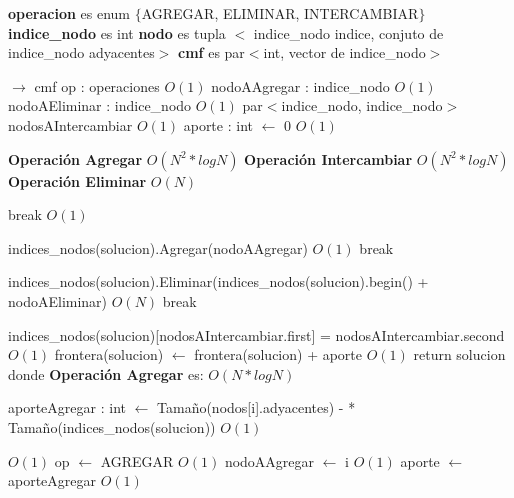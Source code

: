 \documentclass[a4paper, 10pt, twoside]{article}
\newenvironment{pseudo}[1][]{%
    \vspace{1em}%
    \begin{algorithmic}%
}
{%
    \end{algorithmic}%
    \vspace{1em}%
}
\newcommand{\Ode}[1]{\hfill $O(#1)$}
\begin{document}
\begin{pseudo}

\State \textbf{operacion} es enum $\lbrace$AGREGAR, ELIMINAR, INTERCAMBIAR$\rbrace$
\State \textbf{indice\_nodo} es int
\State \textbf{nodo} es tupla $<$ indice\_nodo indice, conjuto de indice\_nodo adyacentes$>$
\State \textbf{cmf} es par$<$int, vector de indice\_nodo$>$

\State
{} $\rightarrow$ cmf
		\State op : operaciones 																	\Ode{1}
		\State nodoAAgregar	: indice\_nodo 															\Ode{1}
		\State nodoAEliminar : indice\_nodo															\Ode{1}
		\State par$<$indice\_nodo, indice\_nodo$>$ nodosAIntercambiar								\Ode{1}
		\State aporte : int  $\leftarrow$ 0															\Ode{1}

		\State
		\State \textbf{Operación Agregar}															\Ode{N^2 * log N}
		\State
		\State \textbf{Operación Intercambiar}														\Ode{N^2 * log N}
		\State
		\State \textbf{Operación Eliminar}															\Ode{N}
		\State

		 break \EndIf																\Ode{1}

			    \State indices\_nodos(solucion).Agregar(nodoAAgregar)								\Ode{1}
			    \State break
		    \EndCase

			    \State indices\_nodos(solucion).Eliminar(indices\_nodos(solucion).begin() + nodoAEliminar)	\Ode{N}
			    \State break
		    \EndCase

			    \State indices\_nodos(solucion)[nodosAIntercambiar.first] = nodosAIntercambiar.second	\Ode{1}
		    \EndCase
		\EndSwitch
		\State
		\State frontera(solucion) $\leftarrow$ frontera(solucion) + aporte 							\Ode{1}
		\State return solucion
	\EndWhile
\EndProcedure
\State
\State donde \textbf{Operación Agregar} es:
\State
											\Ode{N*log N}

				\State aporteAgregar : int $\leftarrow$ Tamaño(nodos[i].adyacentes) -
				 * Tamaño(indices\_nodos(solucion))															\Ode{1}

																						\Ode{1}
					\State op $\leftarrow$ AGREGAR 																	\Ode{1}
					\State nodoAAgregar $\leftarrow$ i 																\Ode{1}
					\State aporte $\leftarrow$ aporteAgregar														\Ode{1}
				\EndIf
			\EndIf
		\EndFor


\end{pseudo}
\end{document}
